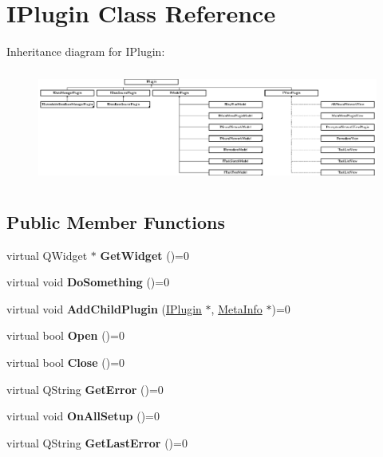 \hypertarget{class_i_plugin}{}\section{I\+Plugin Class Reference}
\label{class_i_plugin}
Inheritance diagram for I\+Plugin\+:\begin{figure}[H]
\begin{center}
\leavevmode
\includegraphics[height=3.733333cm]{class_i_plugin}
\end{center}
\end{figure}
\subsection*{Public Member Functions}
\begin{DoxyCompactItemize}
\item 
\mbox{\label{class_i_plugin_a2d7fd6ff64386dc3451d93a766cfe5ac}} 
virtual Q\+Widget $\ast$ {\bfseries Get\+Widget} ()=0
\item 
\mbox{\label{class_i_plugin_a4fe502f97b8dd2dee1e027031f2bf3bc}} 
virtual void {\bfseries Do\+Something} ()=0
\item 
\mbox{\label{class_i_plugin_a4260318b1f6d80db0c77631465153c3e}} 
virtual void {\bfseries Add\+Child\+Plugin} (\hyperlink{class_i_plugin}{I\+Plugin} $\ast$, \hyperlink{struct_meta_info}{Meta\+Info} $\ast$)=0
\item 
\mbox{\label{class_i_plugin_aa8a0de947d8556119eca015c3102c8a0}} 
virtual bool {\bfseries Open} ()=0
\item 
\mbox{\label{class_i_plugin_aa871cff89f6fec30f76481b5ddd689bf}} 
virtual bool {\bfseries Close} ()=0
\item 
\mbox{\label{class_i_plugin_ac22c5e1c522d1827ae8c81cf14bb52df}} 
virtual Q\+String {\bfseries Get\+Error} ()=0
\item 
\mbox{\label{class_i_plugin_a6cfbb338c5be95b42079d935aad8f02f}} 
virtual void {\bfseries On\+All\+Setup} ()=0
\item 
\mbox{\label{class_i_plugin_a47261bd639ed10f898fd4ecfbc74f4a9}} 
virtual Q\+String {\bfseries Get\+Last\+Error} ()=0
\end{DoxyCompactItemize}


